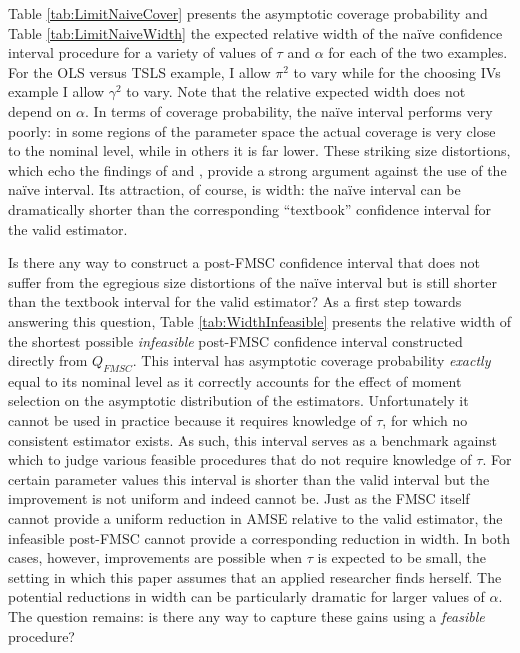 Table \ref{tab:LimitNaiveCover} presents the asymptotic coverage probability and Table \ref{tab:LimitNaiveWidth} the expected relative width of the na\"{i}ve confidence interval procedure for a variety of values of $\tau$ and $\alpha$ for each of the two examples.
For the OLS versus TSLS example, I allow $\pi^2$ to vary while for the choosing IVs example I allow $\gamma^2$ to vary.
Note that the relative expected width does not depend on $\alpha$.
In terms of coverage probability, the na\"{i}ve interval performs very poorly: in some regions of the parameter space the actual coverage is very close to the nominal level, while in others it is far lower.
These striking size distortions, which echo the findings of \cite{Guggenberger2010} and \cite{Guggenberger2012}, provide a strong argument against the use of the na\"{i}ve interval.
Its attraction, of course, is width: the na\"{i}ve interval can be dramatically shorter than the corresponding ``textbook'' confidence interval for the valid estimator.


Is there any way to construct a post-FMSC confidence interval that does not suffer from the egregious size distortions of the na\"{i}ve interval but is still shorter than the textbook interval for the valid estimator?
As a first step towards answering this question, Table \ref{tab:WidthInfeasible} presents the relative width of the shortest possible \emph{infeasible} post-FMSC confidence interval constructed directly from $Q_{FMSC}$.
This interval has asymptotic coverage probability \emph{exactly} equal to its nominal level as it correctly accounts for the effect of moment selection on the asymptotic distribution of the estimators.
Unfortunately it cannot be used in practice because it requires knowledge of $\tau$, for which no consistent estimator exists.
As such, this interval serves as a benchmark against which to judge various feasible procedures that do not require knowledge of $\tau$.
For certain parameter values this interval is shorter than the valid interval but the improvement is not uniform and indeed cannot be.
Just as the FMSC itself cannot provide a uniform reduction in AMSE relative to the valid estimator, the infeasible post-FMSC cannot provide a corresponding reduction in width.
In both cases, however, improvements are possible when $\tau$ is expected to be small, the setting in which this paper assumes that an applied researcher finds herself. 
The potential reductions in width can be particularly dramatic for larger values of $\alpha$.
The question remains: is there any way to capture these gains using a \emph{feasible} procedure?

